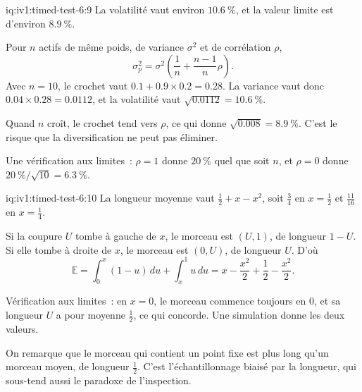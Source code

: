 \begin{solution}{iq:iv1:timed-test-6:9}
La volatilité vaut environ $10.6~\%$, et la valeur limite est d'environ $8.9~\%$.

Pour $n$ actifs de même poids, de variance $\sigma^2$ et de corrélation $\rho$,
\[
\sigma_p^2 = \sigma^2\left(\frac{1}{n} + \frac{n - 1}{n}\rho\right).
\]
Avec $n = 10$, le crochet vaut $0.1 + 0.9 \times 0.2 = 0.28$. La variance vaut donc $0.04 \times 0.28 = 0.0112$, et la volatilité vaut $\sqrt{0.0112} = 10.6~\%$.

Quand $n$ croît, le crochet tend vers $\rho$, ce qui donne $\sqrt{0.008} = 8.9~\%$. C'est le risque que la diversification ne peut pas éliminer.

Une vérification aux limites~: $\rho = 1$ donne $20~\%$ quel que soit $n$, et $\rho = 0$ donne $20~\%/\sqrt{10} = 6.3~\%$.

\end{solution}

\begin{solution}{iq:iv1:timed-test-6:10}
La longueur moyenne vaut $\frac12 + x - x^2$, soit $\frac34$ en $x = \frac12$ et $\frac{11}{16}$ en $x = \frac14$.

Si la coupure $U$ tombe à gauche de $x$, le morceau est $(U, 1)$, de longueur $1 - U$. Si elle tombe à droite de $x$, le morceau est $(0, U)$, de longueur $U$. D'où
\[
\mathbb{E} = \int_0^x(1 - u)\,du + \int_x^1u\,du = x - \frac{x^2}{2} + \frac12 - \frac{x^2}{2}.
\]

Vérification aux limites~: en $x = 0$, le morceau commence toujours en 0, et sa longueur $U$ a pour moyenne $\frac12$, ce qui concorde. Une simulation donne les deux valeurs.

On remarque que le morceau qui contient un point fixe est plus long qu'un morceau moyen, de longueur $\frac12$. C'est l'échantillonnage biaisé par la longueur, qui sous-tend aussi le paradoxe de l'inspection.

\end{solution}

